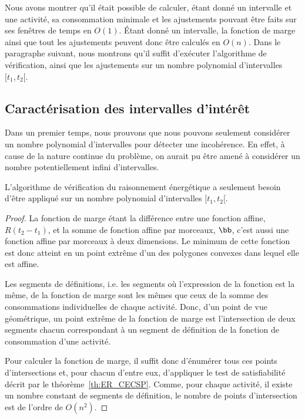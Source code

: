 Nous avons montrer qu'il était possible de calculer, étant donné un
intervalle et une activité, sa consommation minimale et les
ajustements pouvant être faits sur ses fenêtres de temps en
$O(1)$. {\'E}tant donné un intervalle, la fonction de marge ainsi que
tout les ajustements peuvent donc être calculés en $O(n)$. Dans le
paragraphe suivant, nous montrons qu'il suffit d'exécuter l'algorithme
de vérification, ainsi que les ajustements sur un nombre polynomial
d'intervalles $[t_1,t_2[$.

\subsection{Caractérisation des intervalles d'intérêt}

Dans un premier temps, nous prouvons que nous pouvons seulement
considérer un nombre polynomial d'intervalles pour détecter une
incohérence. En effet, à cause de la nature continue du problème, on
aurait pu être amené à considérer un nombre potentiellement infini
d'intervalles. 

\begin{theo}
  L'algorithme de vérification du raisonnement énergétique a seulement
  besoin d'être appliqué sur un nombre polynomial d'intervalles $[t_1,t_2[$.
\end{theo}

\begin{proof}
  La fonction de marge étant la différence entre une fonction affine,
  $R(t_2-t_1)$, et la somme de fonction affine par morceaux,
  $\bb$, c'est aussi une fonction affine par morceaux à deux
  dimensions. Le minimum de cette fonction est donc atteint en un point
  extrême d'un des polygones convexes dans lequel elle est
  affine. 

  Les segments de définitions, i.e. les segments où l'expression de la
  fonction est la même, de la fonction de marge sont les mêmes que ceux
  de la somme des consommations individuelles de chaque activité. Donc,
  d'un point de vue géométrique, un point extrême de la fonction de marge
  est l'intersection de deux segments chacun correspondant à un segment
  de définition de la fonction de consommation d'une activité. 

  Pour calculer la fonction de marge, il suffit donc d'énumérer tous
  ces points d'intersections et, pour chacun d'entre eux, d'appliquer le
  test de satisfiabilité décrit par le
  théorème~\ref{th:ER_CECSP}. Comme, pour chaque activité, il existe un
  nombre constant de segments de définition, le nombre de points
  d'intersection est de l'ordre de $O(n^2)$.
\end{proof}

